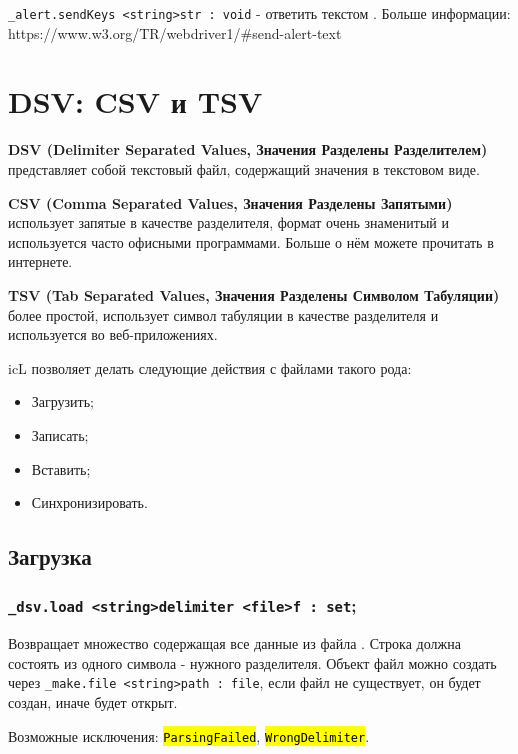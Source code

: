 \documentclass[a4paper, 14pt]{extarticle}
\newcommand{\ferror}[1]{{\fontsize{11pt}{12pt}\tt{\sethlcolor{yellow}\hl{#1}}}}
\newenvironment{icItems}
	{ \begin{itemize} [noitemsep,nolistsep] }
	{ \end{itemize} }
\begin{document}
\lstinline|_alert.sendKeys <string>str : void| - ответить текстом . Больше информации: https://www.w3.org/TR/webdriver1/\#send-alert-text


\newpage
\section{DSV: CSV и TSV}

{\bf DSV (Delimiter Separated Values, Значения Разделены Разделителем)} представляет собой текстовый файл, содержащий значения в текстовом виде.

{\bf CSV (Comma Separated Values, Значения Разделены Запятыми)} использует запятые в качестве разделителя, формат очень знаменитый и используется часто офисными программами. Больше о нём можете прочитать в интернете.

{\bf TSV (Tab Separated Values, Значения Разделены Символом Табуляции)} более простой, использует символ табуляции в качестве разделителя и используется во веб-приложениях.

icL позволяет делать следующие действия с файлами такого рода:
\begin{icItems}
	\item Загрузить;
	\item Записать;
	\item Вставить;
	\item Синхронизировать.
\end{icItems}

\subsection{Загрузка}

\subsubsection{\lstinline|_dsv.load <string>delimiter <file>f : set|;}

Возвращает множество содержащая все данные из файла . Строка  должна состоять из одного символа - нужного разделителя. Объект файл можно создать через \lstinline|_make.file <string>path : file|, если файл не существует, он будет создан, иначе будет открыт.

Возможные исключения: \ferror{ParsingFailed}, \ferror{WrongDelimiter}.
\end{document}
